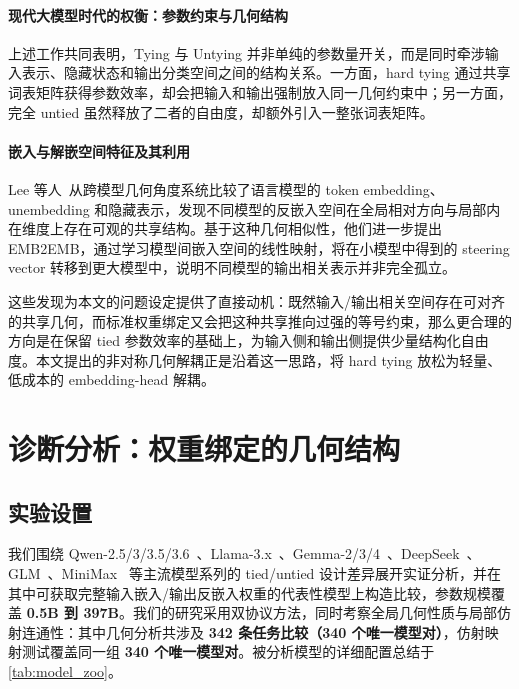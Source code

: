 \documentclass{article}
\theoremstyle{plain}
\theoremstyle{definition}
\theoremstyle{remark}
\begin{document}
\paragraph{现代大模型时代的权衡：参数约束与几何结构}
上述工作共同表明，Tying 与 Untying 并非单纯的参数量开关，而是同时牵涉输入表示、隐藏状态和输出分类空间之间的结构关系。一方面，hard tying 通过共享词表矩阵获得参数效率，却会把输入和输出强制放入同一几何约束中；另一方面，完全 untied 虽然释放了二者的自由度，却额外引入一整张词表矩阵。

\paragraph{嵌入与解嵌空间特征及其利用}
Lee 等人~\cite{lee2025shared}从跨模型几何角度系统比较了语言模型的 token embedding、unembedding 和隐藏表示，发现不同模型的反嵌入空间在全局相对方向与局部内在维度上存在可观的共享结构。基于这种几何相似性，他们进一步提出 EMB2EMB，通过学习模型间嵌入空间的线性映射，将在小模型中得到的 steering vector 转移到更大模型中，说明不同模型的输出相关表示并非完全孤立。

这些发现为本文的问题设定提供了直接动机：既然输入/输出相关空间存在可对齐的共享几何，而标准权重绑定又会把这种共享推向过强的等号约束，那么更合理的方向是在保留 tied 参数效率的基础上，为输入侧和输出侧提供少量结构化自由度。本文提出的非对称几何解耦正是沿着这一思路，将 hard tying 放松为轻量、低成本的 embedding-head 解耦。





\section{诊断分析：权重绑定的几何结构}
\label{sec:Diagnostic}

\subsection{实验设置}
\label{sec:diag_exp_setup}

我们围绕 Qwen-2.5/3/3.5/3.6~\cite{qwen2025qwen25,yang2025qwen3,qwen2026qwen35,qwen2026qwen36_35b}、Llama-3.x~\cite{llama2024llama3}、Gemma-2/3/4~\cite{gemma2024gemma2,gemma2025gemma3,google2026gemma4}、DeepSeek~\cite{deepseek2024v2,deepseek2024v3,deepseek2025r1,deepseek2026v4}、GLM~\cite{glm5team2026glm5,zai2026glm51}、MiniMax~\cite{minimax2026m25,minimax2026m27} 等主流模型系列的 tied/untied 设计差异展开实证分析，并在其中可获取完整输入嵌入/输出反嵌入权重的代表性模型上构造比较，参数规模覆盖 \textbf{0.5B 到 397B}。我们的研究采用双协议方法，同时考察全局几何性质与局部仿射连通性：其中几何分析共涉及 \textbf{342 条任务比较（340 个唯一模型对）}，仿射映射测试覆盖同一组 \textbf{340 个唯一模型对}。被分析模型的详细配置总结于 \cref{tab:model_zoo}。
\end{document}
